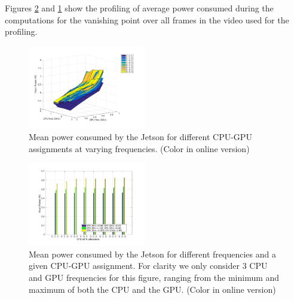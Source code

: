 Figures \ref{fig:dfsa_pow} and \ref{fig:sfda_pow} show the profiling of average power consumed during the computations for the vanishing point over all frames in the video used for the profiling.


\begin{figure}[htbp]
	\centering
	\includegraphics[width=0.46\textwidth]{Figs/surf_Power.pdf}
	\caption{Mean power consumed by the Jetson for different CPU-GPU assignments at varying frequencies. (Color in online version)}
	\label{fig:sfda_pow}%
\end{figure}

\begin{figure}[htbp]
\centering
\includegraphics[width=0.46\textwidth]{Figs/PowerHist.pdf}
\caption{Mean power consumed by the Jetson for different frequencies and a given CPU-GPU assignment.  For clarity we only consider 3 CPU and GPU frequencies for this figure, ranging from the minimum and maximum of both the CPU and the GPU. (Color in online version)}
\label{fig:dfsa_pow} %
\end{figure}